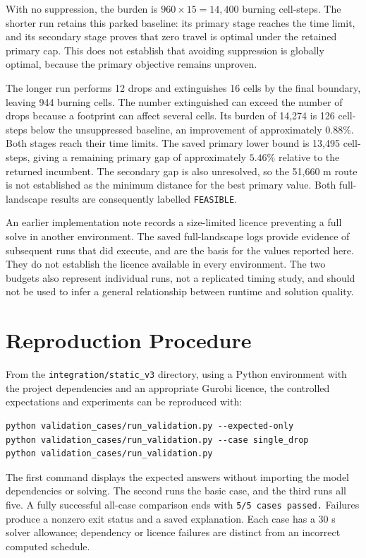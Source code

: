 With no suppression, the burden is $960\times15=14{,}400$ burning cell-steps. The shorter run retains this parked baseline: its primary stage reaches the time limit, and its secondary stage proves that zero travel is optimal under the retained primary cap. This does not establish that avoiding suppression is globally optimal, because the primary objective remains unproven.

The longer run performs 12 drops and extinguishes 16 cells by the final boundary, leaving 944 burning cells. The number extinguished can exceed the number of drops because a footprint can affect several cells. Its burden of 14,274 is 126 cell-steps below the unsuppressed baseline, an improvement of approximately $0.88\%$. Both stages reach their time limits. The saved primary lower bound is 13,495 cell-steps, giving a remaining primary gap of approximately $5.46\%$ relative to the returned incumbent. The secondary gap is also unresolved, so the 51,660 m route is not established as the minimum distance for the best primary value. Both full-landscape results are consequently labelled \texttt{FEASIBLE}.

An earlier implementation note records a size-limited licence preventing a full solve in another environment. The saved full-landscape logs provide evidence of subsequent runs that did execute, and are the basis for the values reported here. They do not establish the licence available in every environment. The two budgets also represent individual runs, not a replicated timing study, and should not be used to infer a general relationship between runtime and solution quality.

\section{Reproduction Procedure}
\label{sec:validation-reproduction}

From the \texttt{integration/static\_v3} directory, using a Python environment with the project dependencies and an appropriate Gurobi licence, the controlled expectations and experiments can be reproduced with:
\begin{verbatim}
python validation_cases/run_validation.py --expected-only
python validation_cases/run_validation.py --case single_drop
python validation_cases/run_validation.py
\end{verbatim}
The first command displays the expected answers without importing the model dependencies or solving. The second runs the basic case, and the third runs all five. A fully successful all-case comparison ends with \texttt{5/5 cases passed.} Failures produce a nonzero exit status and a saved explanation. Each case has a 30 s solver allowance; dependency or licence failures are distinct from an incorrect computed schedule.


